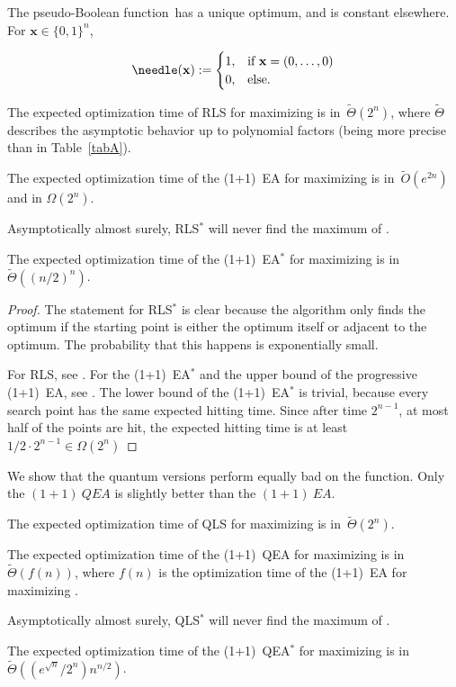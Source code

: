 The pseudo-Boolean function~\needle has a unique optimum, and is constant elsewhere. For $\mathbf{x}\in\{0,1\}^n$,

\begin{equation}
\needle(\mathbf{x}):=\begin{cases}
1, & \text{if } \mathbf{x} = (0,\ldots,0)\\
0, & \text{else.}\end{cases}
\end{equation}

\begin{theorem}\label{thm:needleclassic}
The expected optimization time of RLS for maximizing \needle is in~$\tilde{\Theta}(2^n)$, where $\tilde{\Theta}$ describes the asymptotic behavior up to polynomial factors (being more precise than in Table~\ref{tabA}).

The expected optimization time of the (1+1)~EA for maximizing \needle is in~$\tilde{O}(e^{2n})$ and in $\Omega(2^{n})$.

Asymptotically almost surely, RLS$^*$ will never find the maximum of \needle.

The expected optimization time of the (1+1)~EA$^*$ for maximizing \needle is in~$\tilde{\Theta}((n/2)^{n})$.

\end{theorem}
\begin{proof}
The statement for RLS$^*$ is clear because the algorithm only finds the optimum if the starting point is either the optimum itself or adjacent to the optimum. The probability that this happens is exponentially small.

For RLS, see \cite{aldous83}. For the (1+1)~EA$^*$ and the upper bound of the progressive (1+1)~EA, see \cite{djwea02}. The lower bound of the (1+1)~EA$^*$ is trivial, because every search point has the same expected hitting time. Since after time $2^{n-1}$, at most half of the points are hit, the expected hitting time is at least $1/2 \cdot 2^{n-1} \in \Omega(2^n)$ 
\end{proof}


We show that the quantum versions perform equally bad on the \needle function. Only the $(1+1)~QEA$ is slightly better than the $(1+1)~EA$.
\begin{theorem}
The expected optimization time of QLS for maximizing \needle is in~$\tilde{\Theta}(2^n)$.

The expected optimization time of the (1+1)~QEA for maximizing \needle is in~$\tilde{\Theta}(f(n))$, where $f(n)$ is the optimization time of the (1+1)~EA for maximizing \needle.

Asymptotically almost surely, QLS$^*$ will never find the maximum of \needle.

The expected optimization time of the (1+1)~QEA$^*$ for maximizing \needle is in~$\tilde{\Theta}((e^{\sqrt{n}}/2^n)n^{n/2})$.

\end{theorem}

